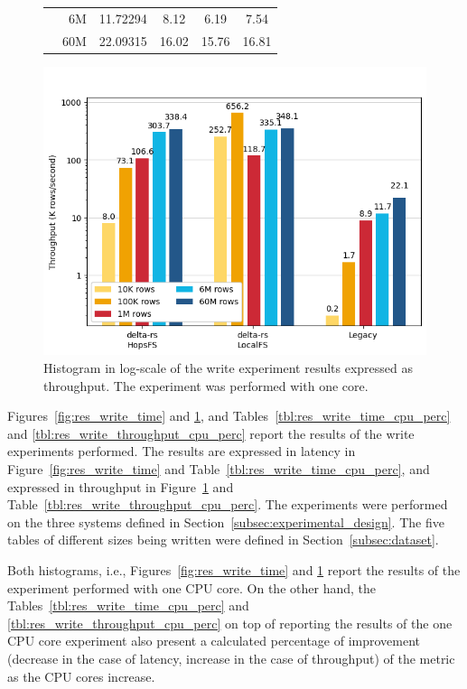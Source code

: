 \begin{figure}
\begin{minipage}[b]{\textwidth}
\begin{tabular}{c r S[table-format=4.5] S[table-format=2.2] S[table-format=2.2] S[table-format=2.2]}
            & 6M &   11.72294 & 8.12 & 6.19 & 7.54\\
            & 60M &  22.09315 & 16.02 & 15.76 & 16.81\\
            \bottomrule
        \end{tabular}
    \end{minipage}
    \begin{minipage}[b]{\textwidth}
        \includegraphics[width=\textwidth]{figures/5-results/write/write_throughput_1_core.png}
        \caption[Histogram of the write experiment - Throughput - 1 CPU core]{Histogram in log-scale of the write experiment results expressed as throughput. The experiment was performed with one  core.}
        \label{fig:res_write_throughput}
    \end{minipage}
\end{figure}

Figures~\ref{fig:res_write_time} and \ref{fig:res_write_throughput}, and Tables~\ref{tbl:res_write_time_cpu_perc} and \ref{tbl:res_write_throughput_cpu_perc} report the results of the write experiments performed. The results are expressed in latency in Figure~\ref{fig:res_write_time} and Table~\ref{tbl:res_write_time_cpu_perc}, and expressed in throughput in Figure~\ref{fig:res_write_throughput} and Table~\ref{tbl:res_write_throughput_cpu_perc}. The experiments were performed on the three systems defined in Section~\ref{subsec:experimental_design}. The five tables of different sizes being written were defined in Section~\ref{subsec:dataset}.

Both histograms, i.e., Figures~\ref{fig:res_write_time} and \ref{fig:res_write_throughput} report the results of the experiment performed with one \gls{CPU} core. On the other hand, the Tables~\ref{tbl:res_write_time_cpu_perc} and \ref{tbl:res_write_throughput_cpu_perc} on top of reporting the results of the one \gls{CPU} core experiment also present a calculated percentage of improvement (decrease in the case of latency, increase in the case of throughput) of the metric as the \gls{CPU} cores increase.

